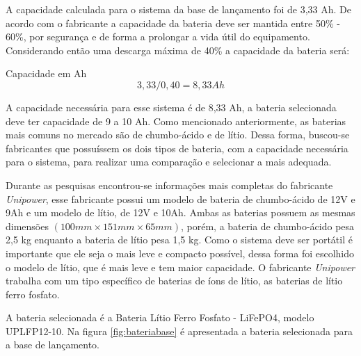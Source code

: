 \par A capacidade calculada para o sistema da base de lançamento foi de 3,33 Ah. De acordo com o fabricante a capacidade da bateria deve ser mantida entre 50\% - 60\%, por segurança e de forma a prolongar a vida útil do equipamento. Considerando então uma descarga máxima de 40\% a capacidade da bateria será:

\par Capacidade em Ah
\begin{equation}
     3,33/0,40 = 8,33 Ah
\end{equation}

\par A capacidade necessária para esse sistema é de 8,33 Ah, a bateria selecionada deve ter capacidade de 9 a 10 Ah. Como mencionado anteriormente, as baterias mais comuns no mercado são de chumbo-ácido e de lítio. Dessa forma, buscou-se fabricantes que possuíssem os dois tipos de bateria, com a capacidade necessária para o sistema, para realizar uma comparação e selecionar a mais adequada.

\par Durante as pesquisas encontrou-se informações mais completas do fabricante \textit{Unipower}, esse fabricante possui um modelo de bateria de chumbo-ácido de 12V e 9Ah e um modelo de lítio, de 12V e 10Ah. Ambas as baterias possuem as mesmas dimensões $(100mm \times 151mm \times 65mm)$, porém, a bateria de chumbo-ácido pesa 2,5 kg enquanto a bateria de lítio pesa 1,5 kg. Como o sistema deve ser portátil é importante que ele seja o mais leve e compacto possível, dessa forma foi escolhido o modelo de lítio, que é mais leve e tem maior capacidade. O fabricante \textit{Unipower} trabalha com um tipo específico de baterias de íons de lítio, as baterias de lítio ferro fosfato.

\par A bateria selecionada é a Bateria Lítio Ferro Fosfato - LiFePO4, modelo UPLFP12-10.  Na figura \ref{fig:bateriabase} é apresentada a bateria selecionada para a base de lançamento. 



